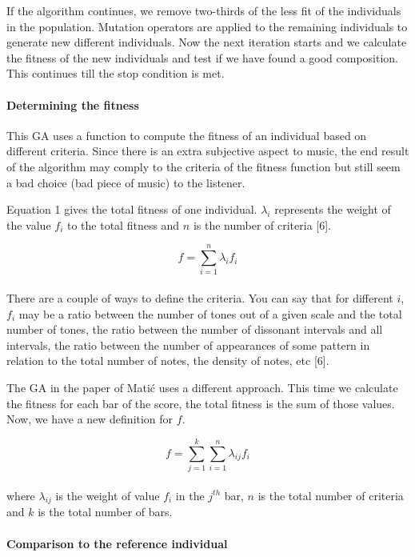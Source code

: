 \documentclass[12pt]{article}
\begin{document}
If the algorithm continues, we remove two-thirds of the less fit of the individuals in the population. Mutation operators are applied to the remaining individuals to generate new different individuals. Now the next iteration starts and we calculate the fitness of the new individuals and test if we have found a good composition.
This continues till the stop condition is met.
\newpage

\paragraph{Determining the fitness}

This GA uses a function to compute the fitness of an individual based on different criteria. Since there is an extra subjective aspect to music, the end result of the algorithm may comply to the criteria of the fitness function but still seem a bad choice (bad piece of music) to the listener. 
\newline

Equation 1 gives the total fitness of one individual. $\lambda_i$ represents the weight of the value $f_i$ to the total fitness and $n$ is the number of criteria [6].

\begin{equation}
f = \sum_{i = 1}^{n}\lambda_i f_i
\end{equation}
\\
There are a couple of ways to define the criteria. You can say that for different $i$, $f_i$ may be a ratio between the number of tones out of a given scale and the total number of tones, the ratio between the number of dissonant intervals and all intervals, the ratio between the number of appearances of some pattern in relation to the total number of notes, the density of notes, etc [6]. 
\newline

The GA in the paper of Mati\'c uses a different approach. This time we calculate the fitness for each bar of the score, the total fitness is the sum of those values. Now, we have a new definition for $f$.

\begin{equation}
f = \sum_{j = 1}^{k} \sum_{i = 1}^{n}\lambda_{ij} f_i
\end{equation}
\\
where $\lambda_{ij}$ is the weight of value $f_i$ in the $j^{th}$ bar, $n$ is the total number of criteria and $k$ is the total number of bars.

\paragraph{Comparison to the reference individual}
\end{document}
